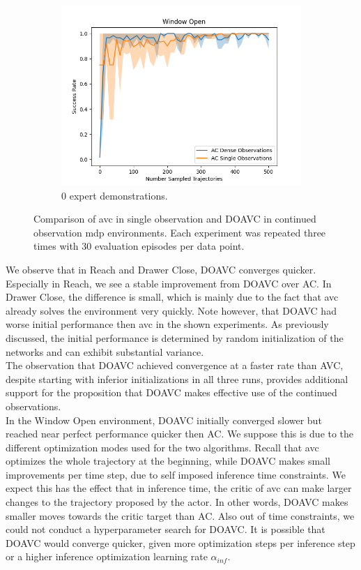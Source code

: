 \begin{figure}[htbp]
\begin{subfigure}[t]{0.32\textwidth}
    \includegraphics[width=\textwidth]{images/dense_vs_sparse_0/Window Open.png}
    \caption{0 expert demonstrations.}
  \end{subfigure}
  \caption{Comparison of \ac{avc} in single observation and DOAVC in continued observation \ac{mdp} environments. Each experiment was repeated three times with 30 evaluation episodes per data point.
  }
  \label{fig:dense_vs_single}
\end{figure}

We observe that in Reach and Drawer Close, DOAVC converges quicker. Especially in Reach, we see a stable improvement from DOAVC over AC. In Drawer Close, the difference is 
small, which is mainly due to the fact that \ac{avc} already solves the environment very quickly. Note however, that DOAVC had worse initial performance then \ac{avc} in the shown experiments. 
As previously discussed, the initial performance is determined by random initialization of the networks and can exhibit substantial 
variance.\\ 

The observation that DOAVC achieved convergence at a faster rate than AVC, despite starting with inferior initializations in 
all three runs, provides additional support for the proposition that DOAVC makes effective use of the continued observations. \\

In the Window Open environment, DOAVC initially converged slower but 
reached near perfect performance quicker then AC. We suppose this is due to the different optimization modes used for the two algorithms. Recall that \ac{avc} optimizes the whole 
trajectory at the beginning, while DOAVC makes small improvements per time step, due to self imposed inference time constraints. We expect this has the effect that in inference time, the critic of 
\ac{avc} can make larger changes to the trajectory proposed by the actor. In other words, DOAVC makes smaller moves towards the critic target than AC. Also out of time constraints, we could 
not conduct a hyperparameter search for DOAVC. It is possible that DOAVC would converge quicker, given more optimization steps per inference step or a higher inference optimization 
learning rate $\alpha_{inf}$.\\ 

